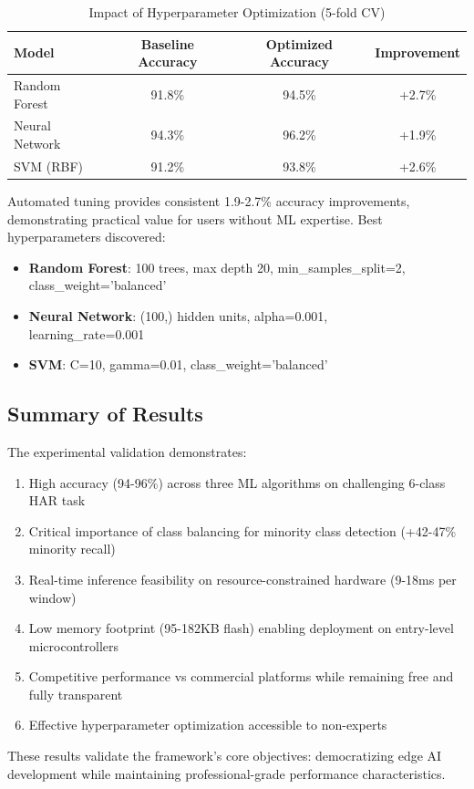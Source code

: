 \begin{table}[H]
    \centering
    \caption{Impact of Hyperparameter Optimization (5-fold CV)}
    \begin{tabular}{@{}lccc@{}}
        \toprule
        Model & Baseline Accuracy & Optimized Accuracy & Improvement \\
        \midrule
        Random Forest & 91.8\% & 94.5\% & +2.7\% \\
        Neural Network & 94.3\% & 96.2\% & +1.9\% \\
        SVM (RBF) & 91.2\% & 93.8\% & +2.6\% \\
        \bottomrule
    \end{tabular}
    \label{tab:hyperopt_impact}
\end{table}

Automated tuning provides consistent 1.9-2.7\% accuracy improvements, demonstrating practical value for users without ML expertise. Best hyperparameters discovered:
\begin{itemize}
    \item \textbf{Random Forest}: 100 trees, max depth 20, min\_samples\_split=2,\\
          class\_weight='balanced'
    \item \textbf{Neural Network}: (100,) hidden units, alpha=0.001,\\
          learning\_rate=0.001
    \item \textbf{SVM}: C=10, gamma=0.01, class\_weight='balanced'
\end{itemize}

\subsection{Summary of Results}
The experimental validation demonstrates:
\begin{enumerate}
    \item High accuracy (94-96\%) across three ML algorithms on challenging 6-class HAR task
    \item Critical importance of class balancing for minority class detection (+42-47\% minority recall)
    \item Real-time inference feasibility on resource-constrained hardware (9-18ms per window)
    \item Low memory footprint (95-182KB flash) enabling deployment on entry-level microcontrollers
    \item Competitive performance vs commercial platforms while remaining free and fully transparent
    \item Effective hyperparameter optimization accessible to non-experts
\end{enumerate}

These results validate the framework's core objectives: democratizing edge AI development while maintaining professional-grade performance characteristics.